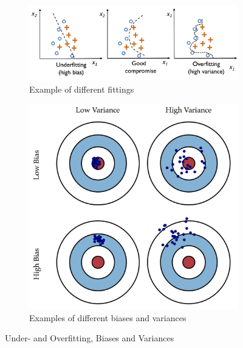 \documentclass[a4paper, 11pt]{article}
\begin{document}
\begin{figure}[htb!]
	\centering
	\begin{subfigure}{0.6\linewidth}
		\centering
		\includegraphics[keepaspectratio,width=\linewidth]{Pictures/under_and_overfitting}
		\caption{Example of different fittings}
	\end{subfigure}
	\begin{subfigure}{0.6\linewidth}
		\centering
		\includegraphics[keepaspectratio,width=\linewidth]{Pictures/biases_and_variances}
		\caption{Examples of different biases and variances}
	\end{subfigure}
	\caption{Under- and Overfitting, Biases and Variances}
\end{figure}
\end{document}
